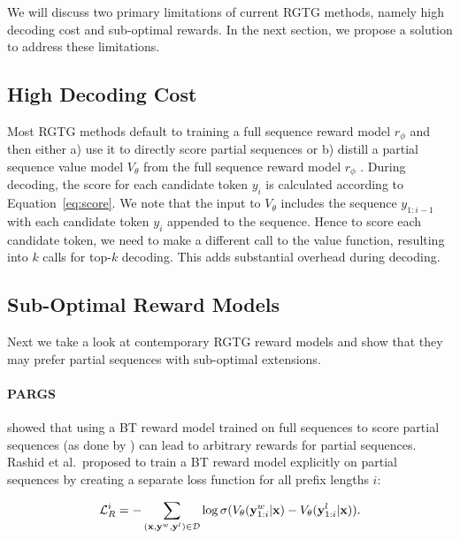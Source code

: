 
We will discuss two primary limitations of current RGTG methods, namely high decoding cost and sub-optimal rewards. In the next section, we propose a solution to address these limitations.

\subsection{High Decoding Cost}
Most RGTG methods default to training a full sequence reward model $r_\phi$ and then either a) use it to directly score partial sequences \cite{khanov2023alignment} or b) distill a partial sequence value model $V_\theta$ from the full sequence reward model $r_\phi$ \cite{mudgalcontrolled}. During decoding, the score for each candidate token $y_i$ is calculated according to Equation~\ref{eq:score}. We note that the input to $V_\theta$ includes the sequence $y_{1:i-1}$ with each candidate token $y_{i}$ appended to the sequence.  Hence to score each candidate token, we need to make a different call to the value function, resulting into $k$ calls for top-$k$ decoding.  This adds substantial overhead during decoding.

\subsection{Sub-Optimal Reward Models}

Next we take a look at contemporary RGTG reward models and show that they may prefer partial sequences with sub-optimal extensions. 

\paragraph{PARGS} \citet{rashid2024critical} showed that using a BT reward model trained on full sequences to score partial sequences (as done by \citet{khanov2023alignment}) can lead to arbitrary rewards for partial sequences. Rashid et al.~proposed to train a BT reward model explicitly on partial sequences by creating a separate loss function for all prefix lengths $i$:

\begin{equation}
  \mathcal{L}_R^i = - \sum_{({\mathbf{x}}, {\mathbf{y}}^w, {\mathbf{y}}^l) \in \mathcal{D}} \log \sigma ( V_{\theta} ({\mathbf{y}}^w_{1:i}|{\mathbf{x}}) - V_{\theta} ({\mathbf{y}}^l_{1:i}|{\mathbf{x}})) . \label{eq:partial-seq-objectives}
\end{equation}


